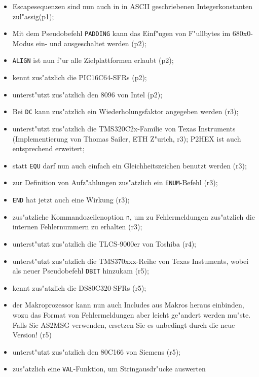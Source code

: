 \documentclass[12pt,a4paper,twoside]{report}
\newcommand{\tty}[1]{{\tt #1}}
\begin{document}
{\begin{itemize}
{\begin{itemize}
{            abgeschaltet werden(p1);}
      \item{Escapesequenzen sind nun auch in in ASCII geschriebenen
            Integerkonstanten zul"assig(p1);}
      \item{Mit dem Pseudobefehl \tty{PADDING} kann das Einf"ugen
            von F"ullbytes im 680x0-Modus ein- und ausgeschaltet
            werden (p2);}
      \item{\tty{ALIGN} ist nun f"ur alle Zielplattformen erlaubt (p2);}
      \item{kennt zus"atzlich die PIC16C64-SFRs (p2);}
      \item{unterst"utzt zus"atzlich den 8096 von Intel (p2);}
      \item{Bei \tty{DC} kann zus"atzlich ein Wiederholungsfaktor angegeben
            werden (r3);}
      \item{unterst"utzt zus"atzlich die TMS320C2x-Familie von Texas
            Instruments (Implementierung von Thomas Sailer, ETH Z"urich,
            r3); P2HEX ist auch entsprechend erweitert;}
      \item{statt \tty{EQU} darf nun auch einfach ein Gleichheitszeichen
            benutzt werden (r3);}
      \item{zur Definition von Aufz"ahlungen zus"atzlich ein
            \tty{ENUM}-Befehl (r3);}
      \item{\tty{END} hat jetzt auch eine Wirkung (r3);}
      \item{zus"atzliche Kommandozeilenoption \tty{n}, um zu Fehlermeldungen
            zus"atzlich die internen Fehlernummern zu erhalten (r3);}
      \item{unterst"utzt zus"atzlich die TLCS-9000er von Toshiba (r4)};
      \item{unterst"utzt zus"atzlich die TMS370xxx-Reihe von Texas
            Instuments, wobei als neuer Pseudobefehl \tty{DBIT}
            hinzukam (r5);}
      \item{kennt zus"atzlich die DS80C320-SFRs (r5);}
      \item{der Makroprozessor kann nun auch Includes aus Makros
            heraus einbinden, wozu das Format von Fehlermeldungen
            aber leicht ge"andert werden mu"ste.  Falls Sie AS2MSG
            verwenden, ersetzen Sie es unbedingt durch die neue
            Version! (r5)}
      \item{unterst"utzt zus"atzlich den 80C166 von Siemens (r5);}
      \item{zus"atzlich eine \tty{VAL}-Funktion, um Stringausdr"ucke auswerten
}
\end{itemize}}
\end{itemize}}
\end{document}

